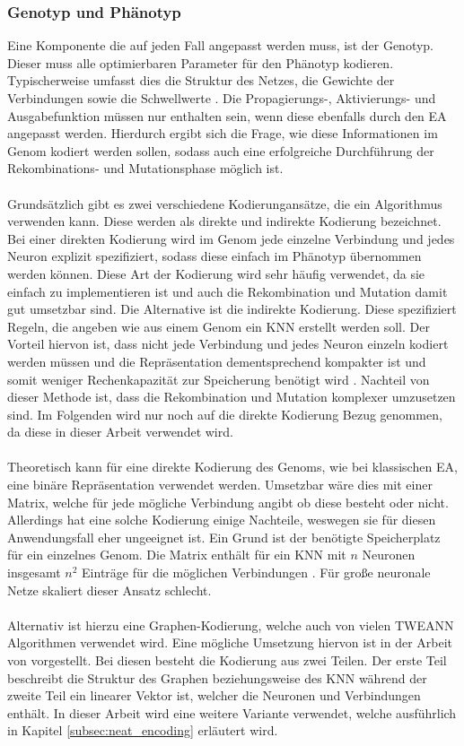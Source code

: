 \subsubsection{Genotyp und Phänotyp}
Eine Komponente die auf jeden Fall angepasst werden muss, ist der Genotyp. Dieser muss alle optimierbaren Parameter für den Phänotyp kodieren. Typischerweise umfasst dies die Struktur des Netzes, die Gewichte der Verbindungen sowie die Schwellwerte \cite{stanley2002evolving}. Die Propagierungs-, Aktivierungs- und Ausgabefunktion müssen nur enthalten sein, wenn diese ebenfalls durch den \ac{EA} angepasst werden. Hierdurch ergibt sich die Frage, wie diese Informationen im Genom kodiert werden sollen, sodass auch eine erfolgreiche Durchführung der Rekombinations- und Mutationsphase möglich ist. 
\\\\
Grundsätzlich gibt es zwei verschiedene Kodierungansätze, die ein Algorithmus verwenden kann. Diese werden als direkte und indirekte Kodierung bezeichnet. Bei einer direkten Kodierung wird im Genom jede einzelne Verbindung und jedes Neuron explizit spezifiziert, sodass diese einfach im Phänotyp übernommen werden können. Diese Art der Kodierung wird sehr häufig verwendet, da sie einfach zu implementieren ist und auch die Rekombination und Mutation damit gut umsetzbar sind. Die Alternative ist die indirekte Kodierung. Diese spezifiziert Regeln, die angeben wie aus einem Genom ein \ac{KNN} erstellt werden soll. Der Vorteil hiervon ist, dass nicht jede Verbindung und jedes Neuron einzeln kodiert werden müssen und die Repräsentation dementsprechend kompakter ist und somit weniger Rechenkapazität zur Speicherung benötigt wird \cite{stanley2002evolving}. Nachteil von dieser Methode ist, dass die Rekombination und Mutation komplexer umzusetzen sind. Im Folgenden wird nur noch auf die direkte Kodierung Bezug genommen, da diese in dieser Arbeit verwendet wird.
\\\\
Theoretisch kann für eine direkte Kodierung des Genoms, wie bei klassischen \ac{EA}, eine binäre Repräsentation verwendet werden. Umsetzbar wäre dies mit einer Matrix, welche für jede mögliche Verbindung angibt ob diese besteht oder nicht. Allerdings hat eine solche Kodierung einige Nachteile, weswegen sie für diesen Anwendungsfall eher ungeeignet ist. Ein Grund ist der benötigte Speicherplatz für ein einzelnes Genom. Die Matrix enthält für ein \ac{KNN} mit $n$ Neuronen insgesamt $n^2$ Einträge für die möglichen Verbindungen \cite{stanley2002evolving}. Für große neuronale Netze skaliert dieser Ansatz schlecht.
\\\\
Alternativ ist hierzu eine Graphen-Kodierung, welche auch von vielen \ac{TWEANN} Algorithmen verwendet wird. Eine mögliche Umsetzung hiervon ist in der Arbeit \cite{pujol1998evolving} von \citeauthor{pujol1998evolving} vorgestellt. Bei diesen besteht die Kodierung aus zwei Teilen. Der erste Teil beschreibt die Struktur des Graphen beziehungsweise des \ac{KNN} während der zweite Teil ein linearer Vektor ist, welcher die Neuronen und Verbindungen enthält. In dieser Arbeit wird eine weitere Variante verwendet, welche ausführlich in Kapitel \ref{subsec:neat_encoding} erläutert wird.

